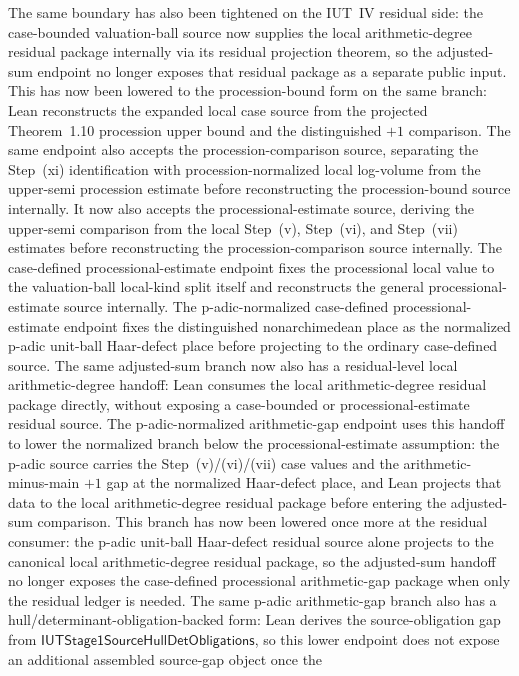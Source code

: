 \documentclass[11pt]{article}
\theoremstyle{plain}
\theoremstyle{definition}
\theoremstyle{remark}
\begin{document}
The same boundary has also been tightened on the IUT~IV residual side: the
case-bounded valuation-ball source now supplies the local arithmetic-degree
residual package internally via its residual projection theorem, so the
adjusted-sum endpoint no longer exposes that residual package as a separate
public input.
This has now been lowered to the procession-bound form on the same branch:
Lean reconstructs the expanded local case source from the projected
Theorem~1.10 procession upper bound and the distinguished \(+1\) comparison.
The same endpoint also accepts the procession-comparison source, separating
the Step~(xi) identification with procession-normalized local log-volume from
the upper-semi procession estimate before reconstructing the procession-bound
source internally.
It now also accepts the processional-estimate source, deriving the upper-semi
comparison from the local Step~(v), Step~(vi), and Step~(vii) estimates before
reconstructing the procession-comparison source internally.
The case-defined processional-estimate endpoint fixes the processional local
value to the valuation-ball local-kind split itself and reconstructs the
general processional-estimate source internally.
The p-adic-normalized case-defined processional-estimate endpoint fixes the
distinguished nonarchimedean place as the normalized p-adic unit-ball
Haar-defect place before projecting to the ordinary case-defined source.
The same adjusted-sum branch now also has a residual-level local arithmetic-degree
handoff: Lean consumes the local arithmetic-degree residual package directly,
without exposing a case-bounded or processional-estimate residual source.  The
p-adic-normalized arithmetic-gap endpoint uses this handoff to lower the
normalized branch below the processional-estimate assumption: the p-adic source
carries the Step~(v)/(vi)/(vii) case values and the arithmetic-minus-main
\(+1\) gap at the normalized Haar-defect place, and Lean projects that data to
the local arithmetic-degree residual package before entering the adjusted-sum
comparison.  This branch has now been lowered once more at the residual
consumer: the p-adic unit-ball Haar-defect residual source alone projects to
the canonical local arithmetic-degree residual package, so the adjusted-sum
handoff no longer exposes the case-defined processional arithmetic-gap package
when only the residual ledger is needed.  The same p-adic arithmetic-gap branch
also has a
hull/determinant-obligation-backed form: Lean derives the source-obligation
gap from \(\mathsf{IUTStage1SourceHullDetObligations}\), so this lower endpoint
does not expose an additional assembled source-gap object once the
\end{document}
